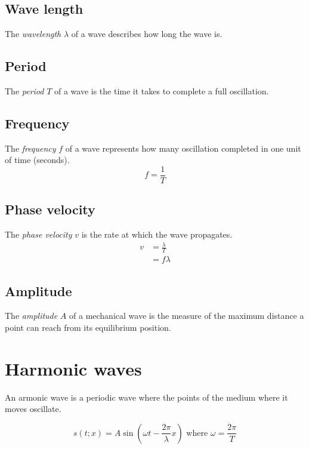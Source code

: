 \documentclass{article}
\begin{document}
\subsection{Wave length}

The \textit{wavelength} \(\lambda\) of a wave describes how long the wave is.

\subsection{Period}

The \textit{period} \(T\) of a wave is the time it takes to complete
a full oscillation.

\subsection{Frequency}

The \textit{frequency} \(f\) of a wave represents how many oscillation
completed in one unit of time (seconds).
\[
    f = \frac{1}{T}
\]

\subsection{Phase velocity}

The \textit{phase velocity} \(v\) is the rate at which
the wave propagates.
\begin{align*}
    v &= \frac{\lambda}{T} \\
    &= f\lambda
\end{align*}

\subsection{Amplitude}

The \textit{amplitude} \(A\) of a mechanical wave is the
measure of the maximum distance a point can reach
from its equilibrium position.

\pagebreak

\section{Harmonic waves}

An armonic wave is a periodic wave where
the points of the medium where it moves oscillate.

\[
    s(t;x) = A \sin
    \left(
        \omega t - \frac{2\pi}{\lambda}x
    \right)
    \text{ where } \omega = \frac{2\pi}{T}
\]
\end{document}
